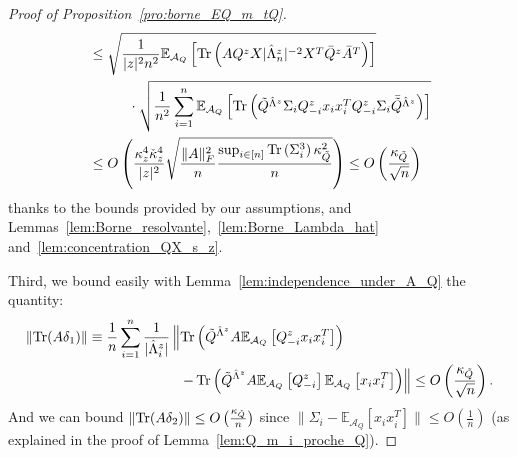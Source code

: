 \documentclass[a4papaer, titlepage]{book}
\begin{document}
\begin{proof}[Proof of Proposition~\ref{pro:borne_EQ_m_tQ}]
\begin{align*}
    &\leq\sqrt{\frac{1}{|z|^2n^2} \mathbb{E}_{\mathcal A_Q}\left[\operatorname{Tr} \left(AQ^z X |\hat \Lambda^z_n |^{-2} X^T\bar Q^z \bar A^T\right) \right]}\\
    &\hspace{1cm}\cdot \sqrt{\frac{1}{n^2}\sum_{i=1}^n \mathbb{E}_{\mathcal A_Q}\left[\operatorname{Tr} \left(\tilde{Q}^{\hat \Lambda^z}\Sigma_ i Q_{-i}^zx_ix_i^T Q_{-i}^z \Sigma_i\bar{\tilde{Q}}^{\hat \Lambda^z}\right)\right]} \\
    &\leq O \left(\frac{\kappa^4_z \check \kappa_z^4}{|z|^2}\sqrt{\frac{\|A\|_F^2 }{ n}\frac{ \sup_{i\in[n]}\operatorname{Tr} \left(\Sigma_i^3\right) \kappa_{\tilde Q}^2 }{ n}}\right) \leq O \left(\frac{\kappa_{\tilde Q}}{\sqrt n}\right)
    \end{align*}
    thanks to the bounds provided by our assumptions, and Lemmas~\ref{lem:Borne_resolvante},~\ref{lem:Borne_Lambda_hat} and~\ref{lem:concentration_QX_s_z}. 

    Third, we bound easily with Lemma~\ref{lem:independence_under_A_Q} the quantity:
    \begin{align*}
      \left\Vert \operatorname{Tr}(A\delta_1) \right\Vert 
      &\equiv \frac{1}{n}\sum_{i=1}^n
      \frac{1}{|\hat \Lambda^z _i|} \left\Vert \operatorname{Tr} \left( \tilde{Q}^{\hat \Lambda^z}  A \mathbb E_{\mathcal A_Q} \left[Q^z_{-i} x_ix_i^T \right]\right) \right. \\
      &\hspace{2.3cm} \left.- \operatorname{Tr} \left(\tilde{Q}^{\hat \Lambda^z}  A\mathbb E_{\mathcal A_Q} \left[Q^z_{-i}\right] \mathbb E_{\mathcal A_Q} \left[ x_ix_i^T\right]\right)\right\Vert \leq O \left(\frac{\kappa_{\tilde Q}}{\sqrt n}\right).
    \end{align*}
    And we can bound $\left\Vert \operatorname{Tr}(A\delta_2) \right\Vert \leq O \left(\frac{\kappa_{\tilde Q}}{n}\right)$ since $\|\Sigma_i - \mathbb E_{\mathcal A_Q}[x_ix_i^T]\| \leq O(\frac{1}{n}) $ (as explained in the proof of Lemma~\ref{lem:Q_m_i_proche_Q}).



\end{proof}
\end{document}
